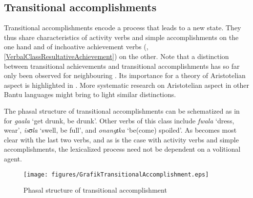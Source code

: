 \subsection{Transitional accomplishments}\label{VerbalClassTransitionalAccomplishment}
Transitional accomplishments encode a process that leads to a new state. They thus share characteristics of activity verbs and simple accomplishments on the one hand and of inchoative achievement verbs (, \ref{VerbalClassResultativeAchievement}) on the other. Note that a distinction between transitional achievements and transitional accomplishments has so far only been observed for neighbouring  \citep{BotneR2008}. Its importance for a theory of Aristotelian aspect is highlighted in \citet{PersohnB2017b}. More systematic research on Aristotelian aspect in other Bantu languages might bring to light similar distinctions.

The phasal structure of transitional accomplishments can be schematized as in  for \textit{gaala} \lq get drunk, be drunk'. Other verbs of this class include \textit{fwala} `dress, wear', \textit{isʊla} \lq swell, be full', and \textit{onangɪka} \lq be(come) spoiled'. As becomes most clear with the last two verbs, and as is the case with activity verbs and simple accomplishments, the lexicalized process need not be dependent on a volitional agent.

\begin{figure}[h]
\begin{center}
\texttt{[image: figures/GrafikTransitionalAccomplishment.eps]}
\end{center}
\caption{Phasal structure of transitional accomplishment}
\label{FigureTransitionalAccomplishment}
\end{figure}

